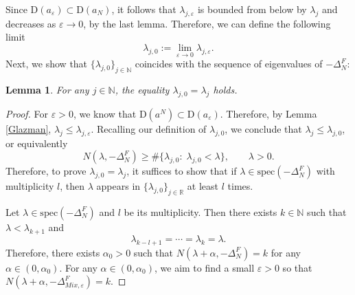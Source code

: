 \documentclass[12pt,a4paper]{amsart}
\numberwithin{equation}{section}
\theoremstyle{plain}
\newtheorem{lemma}[theorem]{Lemma}
\theoremstyle{definition}
\begin{document}
Since $\mathrm{D}(a_{\varepsilon}) \subset \mathrm{D}(a_{N})$, it follows that  $\lambda_{j,\varepsilon}$ is bounded from below by $\lambda_j$ and decreases as $\varepsilon\rightarrow 0$, by the last lemma. Therefore, we can define the following limit 
\begin{equation*}
	\lambda_{j,0} := \lim_{\varepsilon\rightarrow 0} \lambda_{j,\varepsilon}.
\end{equation*}
Next, we show that $\{\lambda_{j,0}\}_{j\in\mathbb{N}}$ coincides with the sequence of eigenvalues of $-\Delta_N^F$: 
\begin{lemma}\label{biject}
	For any $j\in\mathbb{N}$, the equality $\lambda_{j,0} = \lambda_j$ holds. 
\end{lemma}
\begin{proof}
	For $\varepsilon>0$, we know that $\mathrm{D}(a^N) \subset \mathrm{D}(a_\varepsilon)$. Therefore, by Lemma \ref{Glazman}, $\lambda_j\leq \lambda_{j,\varepsilon}$. Recalling our definition of $\lambda_{j,0}$, we conclude that $\lambda_j\leq \lambda_{j,0}$, or equivalently
	\begin{equation*}
		N(\lambda, -\Delta_N^F) \geq \#\{\lambda_{j,0}: \; \lambda_{j,0}<\lambda\}, \qquad \lambda>0.
	\end{equation*}
	Therefore, to prove $\lambda_{j,0} = \lambda_j$, it suffices to show that if $\lambda\in \mathrm{spec} (-\Delta_N^F)$ with multiplicity $l$, then $\lambda$ appears in $\{\lambda_{j,0}\}_{j\in \mathbb{R}}$ at least $l$ times.
	
	Let $\lambda\in \mathrm{spec} (-\Delta_N^F)$ and $l$ be its multiplicity. Then there exists $k\in \mathbb{N}$ such that $\lambda < \lambda_{k+1}$ and 
	\begin{equation*}
		\lambda_{k - l +1}=\cdots = \lambda_k = \lambda.
	\end{equation*}
	Therefore, there exists $\alpha_0>0$ such that $N(\lambda + \alpha, -\Delta_N^F) = k$ for any $\alpha\in (0,\alpha_0)$. For any $\alpha\in (0,\alpha_0)$, we aim to find a small $\varepsilon>0$ so that $N(\lambda + \alpha, -\Delta_{Mix,\varepsilon}^F) = k$. 
	

\end{proof}
\end{document}
